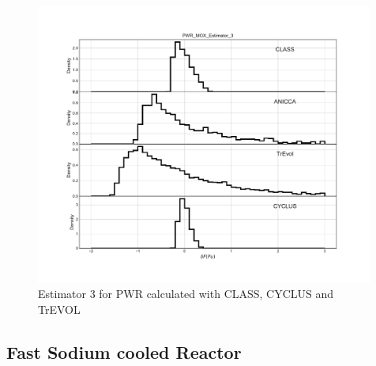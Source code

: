 \begin{figure}[h]
	\begin{center}
		\includegraphics[width = 0.99\textwidth]{../../Feature_1/RAW_DATA/FIG/PWR_MOX_Estimator_3.pdf}
		\caption{Estimator 3 for PWR calculated with CLASS, CYCLUS and TrEVOL}
		\label{fig:Est3_PWR}
	\end{center}
\end{figure}

\subsection{Fast Sodium cooled Reactor}
